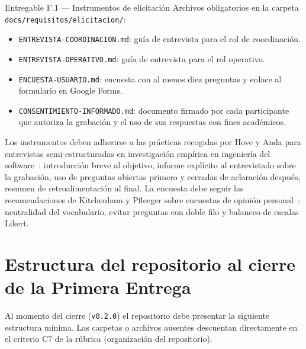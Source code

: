 \documentclass[11pt,a4paper]{article}
\begin{document}
\begin{cajaentregable}{Entregable F.1 --- Instrumentos de elicitaci\'on}
Archivos obligatorios en la carpeta \texttt{docs/requisitos/elicitacion/}:
\begin{itemize}
    \item \texttt{ENTREVISTA-COORDINACION.md}: gu\'ia de entrevista para el rol de coordinaci\'on.
    \item \texttt{ENTREVISTA-OPERATIVO.md}: gu\'ia de entrevista para el rol operativo.
    \item \texttt{ENCUESTA-USUARIO.md}: encuesta con al menos diez preguntas y enlace al formulario en Google Forms.
    \item \texttt{CONSENTIMIENTO-INFORMADO.md}: documento firmado por cada participante que autoriza la grabaci\'on y el uso de sus respuestas con fines acad\'emicos.
\end{itemize}
\end{cajaentregable}

Los instrumentos deben adherirse a las pr\'acticas recogidas por Hove y Anda para entrevistas semi-estructuradas en investigaci\'on emp\'irica en ingenier\'ia del software~\cite{hove2005interviews}: introducci\'on breve al objetivo, informe expl\'icito al entrevistado sobre la grabaci\'on, uso de preguntas abiertas primero y cerradas de aclaraci\'on despu\'es, resumen de retroalimentaci\'on al final. La encuesta debe seguir las recomendaciones de Kitchenham y Pfleeger sobre encuestas de opini\'on personal~\cite{kitchenham2008surveys}: neutralidad del vocabulario, evitar preguntas con doble filo y balanceo de escalas Likert.

\section{Estructura del repositorio al cierre de la Primera Entrega}

Al momento del cierre (\texttt{v0.2.0}) el repositorio debe presentar la siguiente estructura m\'inima. Las carpetas o archivos ausentes descuentan directamente en el criterio C7 de la r\'ubrica (organizaci\'on del repositorio).
\end{document}
